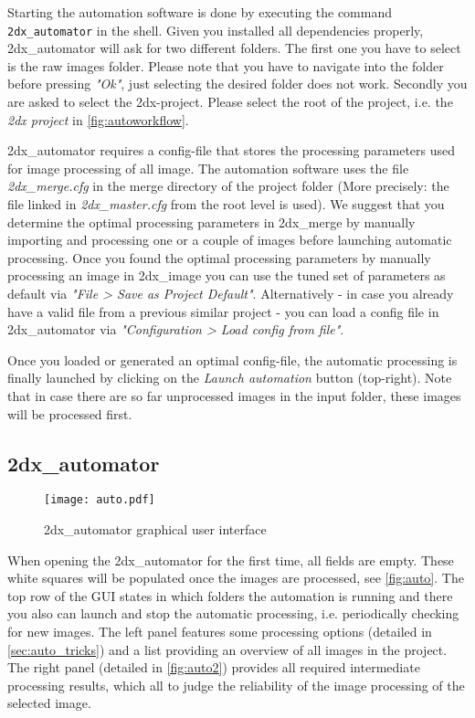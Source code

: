 Starting the automation software is done by executing the command \texttt{2dx\_automator} in the shell. Given you installed all dependencies properly, 2dx\_automator will ask for two different folders. The first one you have to select is the raw images folder. Please note that you have to navigate into the folder before pressing \textit{"Ok"}, just selecting the desired folder does not work. Secondly you are asked to select the 2dx-project. Please select the root of the project, i.e. the \textit{2dx project} in \autoref{fig:autoworkflow}.

2dx\_automator requires a config-file that stores the processing parameters used for image processing of all image. The automation software uses the file \textit{2dx\_merge.cfg} in the merge directory of the project folder (More precisely: the file linked in \textit{2dx\_master.cfg} from the root level is used). We suggest that you determine the optimal processing parameters in 2dx\_merge by manually importing and processing one or a couple of images before launching automatic processing. Once you found the optimal processing parameters by manually processing an image in 2dx\_image you can use the tuned set of parameters as default via \textit{"File > Save as Project Default"}. Alternatively - in case you already have a valid file from a previous similar project - you can load a config file in 2dx\_automator via \textit{"Configuration > Load config from file"}.

Once you loaded or generated an optimal config-file, the  automatic processing is finally launched by clicking on the \textit{Launch automation} button (top-right). Note that in case there are so far unprocessed images in the input folder, these images will be processed first.

\subsection{2dx\_automator}

\begin{figure}
	\centering
	\texttt{[image: auto.pdf]}
	\caption{2dx\_automator graphical user interface}
	\label{fig:auto}
\end{figure}

When opening the 2dx\_automator for the first time, all fields are empty. These white squares will be populated once the images are processed, see \autoref{fig:auto}. The top row of the GUI states in which folders the automation is running and there you also can launch and stop the automatic processing, i.e. periodically checking for new images. The left panel features some processing options (detailed in \autoref{sec:auto_tricks}) and a list providing an overview of all images in the project. The right panel (detailed in \autoref{fig:auto2}) provides all required intermediate processing results, which all to judge the reliability of the image processing of the selected image. 

